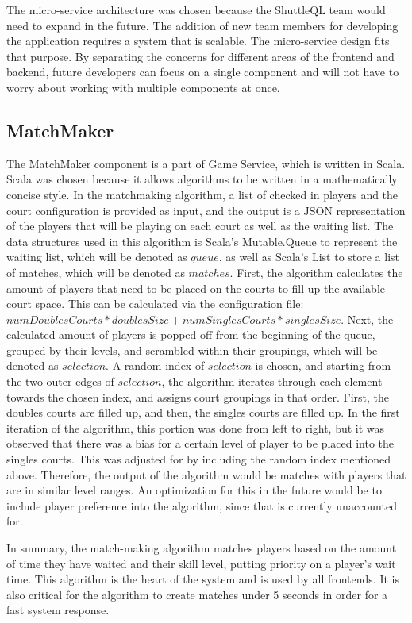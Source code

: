 \documentclass{article}
\begin{document}
The micro-service architecture was chosen because the ShuttleQL team would need to expand in the future. The addition of new team members for developing the application requires a system that is scalable. The micro-service design fits that purpose. By separating the concerns for different areas of the frontend and backend, future developers can focus on a single component and will not have to worry about working with multiple components at once.

\subsection{MatchMaker}
The MatchMaker component is a part of Game Service, which is written in Scala. Scala was chosen because it allows algorithms to be written in a mathematically concise style. In the matchmaking algorithm, a list of checked in players and the court configuration is provided as input, and the output is a JSON representation of the players that will be playing on each court as well as the waiting list. The data structures used in this algorithm is Scala's Mutable.Queue to represent the waiting list, which will be denoted as $queue$, as well as Scala's List to store a list of matches, which will be denoted as $matches$. First, the algorithm calculates the amount of players that need to be placed on the courts to fill up the available court space. This can be calculated via the configuration file: $numDoublesCourts * doublesSize + numSinglesCourts * singlesSize$. Next, the calculated amount of players is popped off from the beginning of the queue, grouped by their levels, and scrambled within their groupings, which will be denoted as $selection$. A random index of $selection$ is chosen, and starting from the two outer edges of $selection$, the algorithm iterates through each element towards the chosen index, and assigns court groupings in that order. First, the doubles courts are filled up, and then, the singles courts are filled up. In the first iteration of the algorithm, this portion was done from left to right, but it was observed that there was a bias for a certain level of player to be placed into the singles courts. This was adjusted for by including the random index mentioned above. Therefore, the output of the algorithm would be matches with players that are in similar level ranges. An optimization for this in the future would be to include player preference into the algorithm, since that is currently unaccounted for.

In summary, the match-making algorithm matches players based on the amount of time they have waited and their skill level, putting priority on a player's wait time. This algorithm is the heart of the system and is used by all frontends. It is also critical for the algorithm to create matches under 5 seconds in order for a fast system response.
\end{document}
